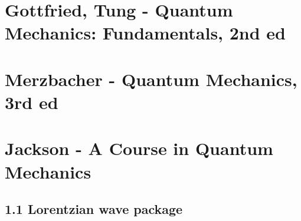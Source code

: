\documentclass[../main.tex]{subfiles}
\begin{document}
\section{{\sc Gottfried, Tung} - Quantum Mechanics: Fundamentals, 2nd ed}

\section{{\sc Merzbacher} - Quantum Mechanics, 3rd ed}

\section{{\sc Jackson} - A Course in Quantum Mechanics}
\subsection{1.1 Lorentzian wave package}
\end{document}
